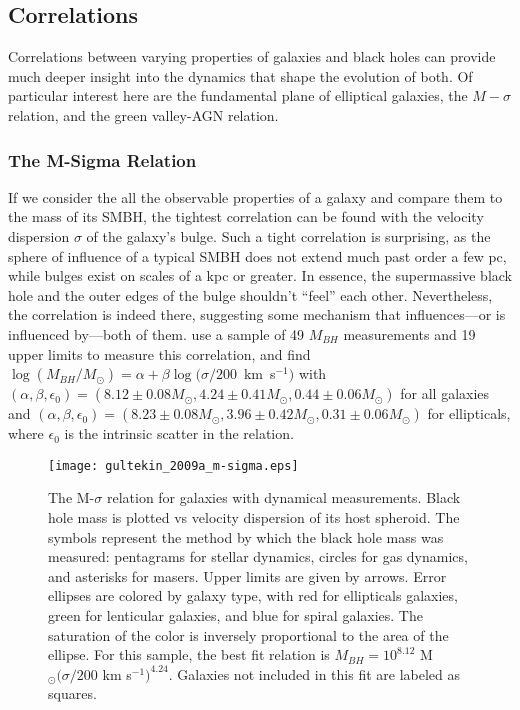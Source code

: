 


\subsection{Correlations}

Correlations between varying properties of galaxies and black holes can provide much deeper insight into the dynamics that shape the evolution of both.  Of particular interest here are the fundamental plane of elliptical galaxies, the $M-\sigma$ relation, and the green valley-AGN relation.


\subsubsection{The M-Sigma Relation}

If we consider the all the observable properties of a galaxy and compare them to the mass of its SMBH, the tightest correlation can be found with the velocity dispersion $\sigma$ of the galaxy's bulge.  Such a tight correlation is surprising, as the sphere of influence of a typical SMBH does not extend much past order a few pc, while bulges exist on scales of a kpc or greater.  In essence, the supermassive black hole and the outer edges of the bulge shouldn't ``feel'' each other.  Nevertheless, the correlation is indeed there, suggesting some mechanism that influences---or is influenced by---both of them.  \citet{gultekin_2009a} use a sample of 49 $M_{BH}$ measurements and 19 upper limits to measure this correlation, and find $\log(M_{BH}/M_{\odot}) = \alpha + \beta \log(\sigma/200$~km~s$^{-1})$ with $(\alpha, \beta, \epsilon_{0}) = (8.12 \pm 0.08 M_{\odot}, 4.24 \pm 0.41 M_{\odot}, 0.44 \pm 0.06 M_{\odot})$ for all galaxies and $(\alpha, \beta, \epsilon_{0}) = (8.23 \pm 0.08 M_{\odot}, 3.96 \pm 0.42 M_{\odot}, 0.31 \pm 0.06 M_{\odot})$ for ellipticals, where $\epsilon_{0}$ is the intrinsic scatter in the relation.

\begin{figure}[H]
\centering
\texttt{[image: gultekin\_2009a\_m-sigma.eps]}
\caption[The M-$\sigma$ relation for galaxies with dynamical measurements]{\footnotesize The M-$\sigma$ relation for galaxies with dynamical measurements.  Black hole mass is plotted vs velocity dispersion of its host spheroid.  The symbols represent the method by which the black hole mass was measured:  pentagrams for stellar dynamics, circles for gas dynamics, and asterisks for masers.  Upper limits are given by arrows.  Error ellipses are colored by galaxy type, with red for ellipticals galaxies, green for lenticular galaxies, and blue for spiral galaxies.  The saturation of the color is inversely proportional to the area of the ellipse.  For this sample, the best fit relation is $M_{BH} = 10^{8.12}$ M$_{\odot} (\sigma / 200$ km s$^{-1})^{4.24}$.  Galaxies not included in this fit are labeled as squares.  \citep{gultekin_2009a}}
\label{fig:m-sigma}
\end{figure}


